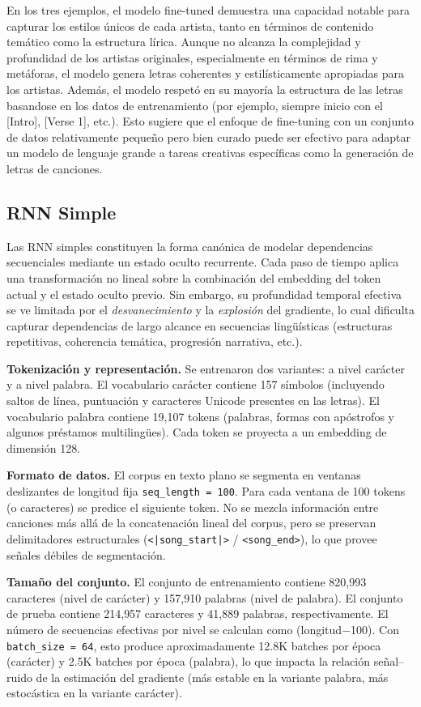 \documentclass[paper=letter, fontsize=11pt, draft=false]{scrartcl}
\numberwithin{equation}{section} %
\numberwithin{figure}{section} %
\numberwithin{table}{section} %
\numberwithin{subsection}{section}
\begin{document}
En los tres ejemplos, el modelo fine-tuned demuestra una capacidad notable para capturar los estilos únicos de cada artista, tanto en términos de contenido temático como la estructura lírica. Aunque no alcanza la complejidad y profundidad de los artistas originales, especialmente en términos de rima y metáforas, el modelo genera letras coherentes y estilísticamente apropiadas para los artistas. Además, el modelo respetó en su mayoría la estructura de las letras basandose en los datos de entrenamiento (por ejemplo, siempre inicio con el [Intro], [Verse 1], etc.). Esto sugiere que el enfoque de fine-tuning con un conjunto de datos relativamente pequeño pero bien curado puede ser efectivo para adaptar un modelo de lenguaje grande a tareas creativas específicas como la generación de letras de canciones.

\newpage
\subsection{RNN Simple}
Las RNN simples constituyen la forma canónica de modelar dependencias secuenciales mediante un estado oculto recurrente. Cada paso de tiempo aplica una transformación no lineal sobre la combinación del embedding del token actual y el estado oculto previo. Sin embargo, su profundidad temporal efectiva se ve limitada por el \emph{desvanecimiento} y la \emph{explosión} del gradiente, lo cual dificulta capturar dependencias de largo alcance en secuencias lingüísticas (estructuras repetitivas, coherencia temática, progresión narrativa, etc.).

	\textbf{Tokenización y representación.} Se entrenaron dos variantes: a nivel carácter y a nivel palabra. El vocabulario carácter contiene 157 símbolos (incluyendo saltos de línea, puntuación y caracteres Unicode presentes en las letras). El vocabulario palabra contiene 19{,}107 tokens (palabras, formas con apóstrofos y algunos préstamos multilingües). Cada token se proyecta a un embedding de dimensión 128.

	\textbf{Formato de datos.} El corpus en texto plano se segmenta en ventanas deslizantes de longitud fija \texttt{seq\_length = 100}. Para cada ventana de 100 tokens (o caracteres) se predice el siguiente token. No se mezcla información entre canciones más allá de la concatenación lineal del corpus, pero se preservan delimitadores estructurales (\texttt{<|song\_start|>} / \texttt{<song\_end>}), lo que provee señales débiles de segmentación.

	\textbf{Tamaño del conjunto.} El conjunto de entrenamiento contiene 820{,}993 caracteres (nivel de carácter) y 157{,}910 palabras (nivel de palabra). El conjunto de prueba contiene 214{,}957 caracteres y 41{,}889 palabras, respectivamente. El número de secuencias efectivas por nivel se calculan como (longitud$-$100). Con \texttt{batch\_size = 64}, esto produce aproximadamente 12.8K batches por época (carácter) y 2.5K batches por época (palabra), lo que impacta la relación señal–ruido de la estimación del gradiente (más estable en la variante palabra, más estocástica en la variante carácter).
\end{document}
